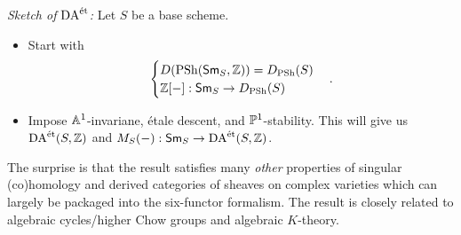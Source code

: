 \emph{Sketch of $\DAet$:} Let $S$ be a base scheme.
\begin{itemize}
	\item Start with
		\[
		\begin{cases}
			D(\PSh(\cat{Sm}_S, \Z)) = D_{\PSh}(S) \\
			\Z[-]: \cat{Sm}_S \to D_{\PSh}(S)
		\end{cases}
		.\] 
	\item Impose $\Aff^{1}$-invariane, \'etale descent, and $\P^{1}$-stability. This will give us $\DAet(S,\Z)$ and $M_S(-):\cat{Sm}_S\to \DAet(S,\Z)$.
\end{itemize}
The surprise is that the result satisfies many \emph{other} properties of singular (co)homology and derived categories of sheaves on complex varieties which can largely be packaged into the six-functor formalism. The result is closely related to algebraic cycles/higher Chow groups and algebraic $K$-theory.



